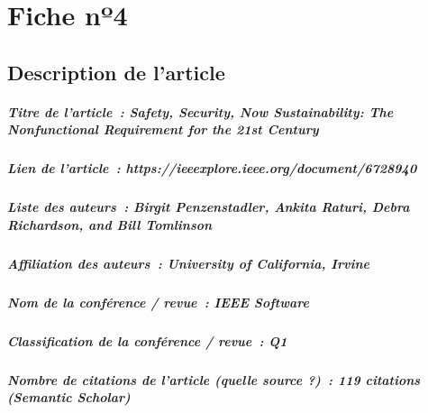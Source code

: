 
\chapter{Fiche nº4} %
\label{app:Fiche4} %

\section{Description de l'article}

\paragraph{Titre de l'article~: \textnormal{Safety, Security, Now Sustainability: The Nonfunctional Requirement for the 21st Century}}
\paragraph{Lien de l'article~: \textnormal{https://ieeexplore.ieee.org/document/6728940}}
\paragraph{Liste des auteurs~: \textnormal{Birgit Penzenstadler, Ankita Raturi, Debra Richardson,
and Bill Tomlinson}}
\paragraph{Affiliation des auteurs~: \textnormal{University of California, Irvine}}
\paragraph{Nom de la conférence / revue~: \textnormal{IEEE Software}}
\paragraph{Classification de la conférence / revue~: \textnormal{Q1}}
\paragraph{Nombre de citations de l'article (quelle source ?)~: \textnormal{119 citations (Semantic Scholar)}}



